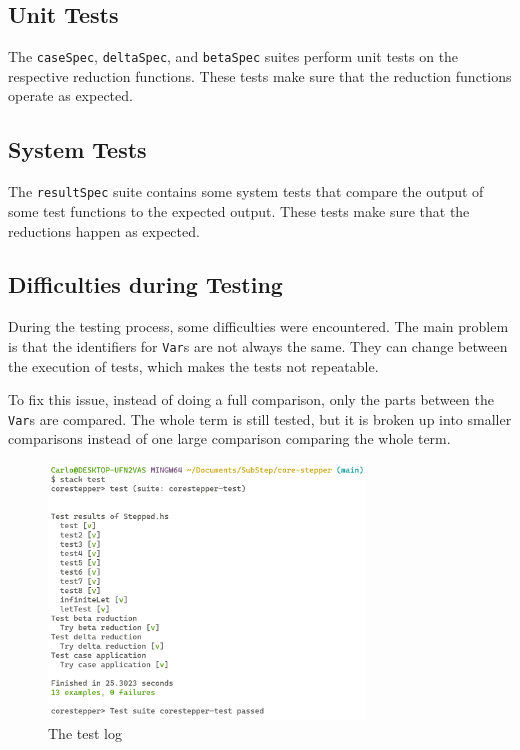 \subsection{Unit Tests}
The \texttt{caseSpec}, \texttt{deltaSpec}, and \texttt{betaSpec} suites perform unit tests on the respective reduction functions.
These tests make sure that the reduction functions operate as expected.

\subsection{System Tests}
The \texttt{resultSpec} suite contains some system tests that compare the output of some test functions to the expected output.
These tests make sure that the reductions happen as expected.

\subsection{Difficulties during Testing}
During the testing process, some difficulties were encountered.
The main problem is that the identifiers for \texttt{Var}s are not always the same.
They can change between the execution of tests,
which makes the tests not repeatable.

To fix this issue,
instead of doing a full comparison,
only the parts between the \texttt{Var}s are compared.
The whole term is still tested,
but it is broken up into smaller comparisons instead of one large comparison comparing the whole term.

\begin{figure}[!ht]
    \includegraphics[width=0.75\textwidth]{resources/Tests.PNG}
    \caption{The test log}
    \label{fig:testlog}
\end{figure}
